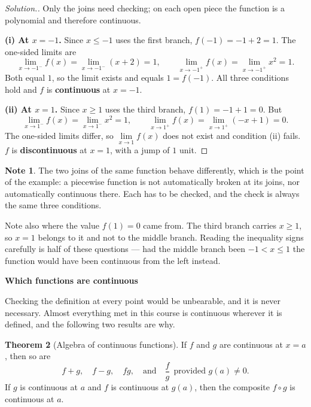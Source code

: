 \documentclass[11pt,a4paper]{article}
\theoremstyle{definition}
\newtheorem{thm}{Theorem}[section]
\newtheorem{note}[thm]{Note}
\newenvironment{solution}
  {\renewcommand{\qedsymbol}{}\begin{proof}[\textit{Solution}.]}
  {\end{proof}}
\begin{document}
\begin{solution}
Only the joins need checking; on each open piece the function is a polynomial and
therefore continuous.

\textbf{(i) At $x=-1$.} Since $x\leq -1$ uses the first branch,
$f(-1)=-1+2=1$. The one-sided limits are
$$\lim_{x\to -1^{-}}f(x)=\lim_{x\to -1^{-}}(x+2)=1,
\qquad \lim_{x\to -1^{+}}f(x)=\lim_{x\to -1^{+}}x^{2}=1 .$$
Both equal $1$, so the limit exists and equals $1=f(-1)$. All three conditions
hold and $f$ is \textbf{continuous} at $x=-1$.

\textbf{(ii) At $x=1$.} Since $x\geq 1$ uses the third branch,
$f(1)=-1+1=0$. But
$$\lim_{x\to 1^{-}}f(x)=\lim_{x\to 1^{-}}x^{2}=1,
\qquad \lim_{x\to 1^{+}}f(x)=\lim_{x\to 1^{+}}(-x+1)=0 .$$
The one-sided limits differ, so $\lim\limits_{x\to 1}f(x)$ does not exist and
condition (ii) fails. $f$ is \textbf{discontinuous} at $x=1$, with a jump of
$1$ unit.
\end{solution}

\begin{note}
The two joins of the same function behave differently, which is the point of the
example: a piecewise function is not automatically broken at its joins, nor
automatically continuous there. Each has to be checked, and the check is always the
same three conditions.

Note also where the value $f(1)=0$ came from. The third branch carries $x\geq 1$,
so $x=1$ belongs to it and not to the middle branch. Reading the inequality signs
carefully is half of these questions --- had the middle branch been $-1<x\leq 1$ the
function would have been continuous from the left instead.
\end{note}

\begin{center}
\textbf{Which functions are continuous}
\end{center}

Checking the definition at every point would be unbearable, and it is never
necessary. Almost everything met in this course is continuous wherever it is
defined, and the following two results are why.

\begin{thm}[Algebra of continuous functions]
If $f$ and $g$ are continuous at $x=a$, then so are
$$f+g,\quad f-g,\quad fg,\quad \text{and}\quad 
\frac{f}{g}\ \ \text{provided } g(a)\neq 0 .$$
If $g$ is continuous at $a$ and $f$ is continuous at $g(a)$, then the composite
$f\circ g$ is continuous at $a$.
\end{thm}
\end{document}
